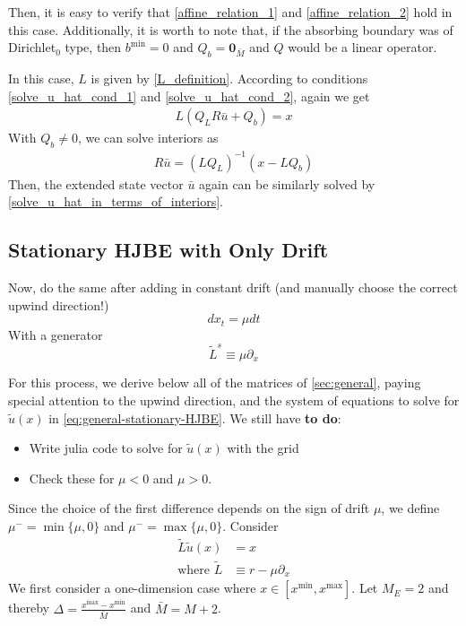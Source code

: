 \documentclass[11pt]{article}
\newcommand{\D}[1][]{\ensuremath{\partial_{#1}}}
\begin{document}
Then, it is easy to verify that \cref{affine_relation_1} and \cref{affine_relation_2} hold in this case. Additionally, it is worth to note that, if the absorbing boundary was of Dirichlet$_0$ type, then $b^{\min} = 0$ and $Q_b = \mathbf{0}_{\bar{M}}$ and $Q$ would be a linear operator.

In this case, $L$ is given by \cref{L_definition}. According to conditions \cref{solve_u_hat_cond_1} and \cref{solve_u_hat_cond_2}, again we get
\begin{align}
L(Q_L R \bar{u}+Q_b) = x
\end{align}
With $Q_b\neq 0$, we can solve interiors as
\begin{align}
R\bar{u} = (L Q_L)^{-1}(x-L Q_b)
\end{align}
Then, the extended state vector $\bar{u}$ again can be similarly solved by \cref{solve_u_hat_in_terms_of_interiors}.
\subsection{Stationary HJBE with Only Drift}
Now, do the same after adding in constant drift (and manually choose the correct upwind direction!)
$$
d x_t = \mu dt
$$
With a generator
\begin{equation}
	\tilde{L}^s \equiv \mu \D[x]\label{eq:L-s-drift}
\end{equation}

For this process, we derive below all of the matrices of \cref{sec:general}, paying special attention to the upwind direction, and the system of equations to solve for $\tilde{u}(x)$ in \cref{eq:general-stationary-HJBE}. We still have \textbf{to do}:
\begin{itemize}
	\item Write julia code to solve for $\tilde{u}(x)$ with the grid
	\item Check these for $\mu < 0$ and $\mu > 0$.
\end{itemize}

Since the choice of the first difference depends on the sign of drift $\mu$, we define $\mu^- =\min\{\mu, 0\}$ and $\mu^- =\max\{\mu, 0\}$.
Consider
\begin{align}
\tilde{L} \tilde{u}(x) &= x\label{HJBE_PDE_with_drifts}\\
\text{where }\tilde{L}&\equiv r - \mu\partial_{x}
\end{align}
We first consider a one-dimension case where $x\in [x^{\min},x^{\max}]$. Let $M_E = 2$ and thereby $\Delta  = \frac{x^{\max}-x^{\min}}{\bar{M}}$ and $\bar{M} = M+2$.
\end{document}
